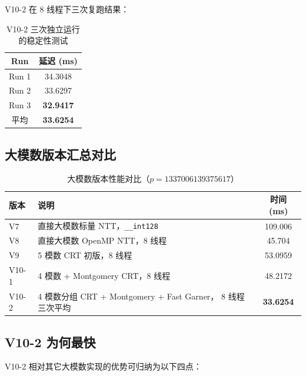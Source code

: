 \documentclass[UTF8,a4paper,10pt]{ctexart}
\begin{document}
V10-2 在 8 线程下三次复跑结果：

\begin{table}[H]
  \centering
  \begin{tabular}{cc}
  \toprule  
  \textbf{Run} & \textbf{延迟 (ms)}\\
  \midrule
  Run 1 & 34.3048 \\
  Run 2 & 33.6297 \\
  Run 3 & \textbf{32.9417} \\
  \midrule
  平均  & \textbf{33.6254} \\
  \bottomrule
  \end{tabular}
  \caption{V10-2 三次独立运行的稳定性测试}
  \label{tab:v10-stability}
\end{table}

\subsection{大模数版本汇总对比}

\begin{table}[H]
  \centering
  \renewcommand{\arraystretch}{1.15}
  \begin{tabular}{lp{6.5cm}c}
  \toprule  
  \textbf{版本} & \textbf{说明} & \textbf{时间 (ms)}\\
  \midrule
  V7    & 直接大模数标量 NTT，\texttt{\_\_int128}              & 109.006 \\
  V8    & 直接大模数 OpenMP NTT，8 线程                        & 45.704  \\
  V9    & 5 模数 CRT 初版，8 线程                              & 53.0959 \\
  V10-1 & 4 模数 + Montgomery CRT，8 线程                      & 48.2172 \\
  V10-2 & 4 模数分组 CRT + Montgomery + Fast Garner，
          8 线程三次平均                                       & \textbf{33.6254} \\
  \bottomrule
  \end{tabular}
  \caption{大模数版本性能对比（$p = 1337006139375617$）}
  \label{tab:large-modulus}
\end{table}

\subsection{V10-2 为何最快}

V10-2 相对其它大模数实现的优势可归纳为以下四点：
\end{document}
